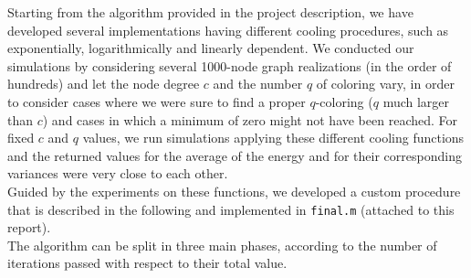 Starting from the algorithm provided in the project description, we have developed several implementations having different cooling procedures, such as exponentially, logarithmically and linearly dependent.
We conducted our simulations by considering several 1000-node graph realizations (in the order of hundreds) and let the node degree $c$ and the number $q$ of coloring vary, in order to consider cases where we were sure to find a proper $q$-coloring ($q$ much larger than $c$) and cases in which a minimum of zero might not have been reached.
For fixed $c$ and $q$ values, we run simulations applying these different cooling functions and %
the returned values for the average of the energy and for their corresponding variances were very close to each other.\\
Guided by the experiments on these functions, we developed a custom procedure that is described in the following and implemented in \texttt{final.m} (attached to this report).\\
\indent
The algorithm can be split in three main phases, according to the number of iterations passed with respect to their total value.
